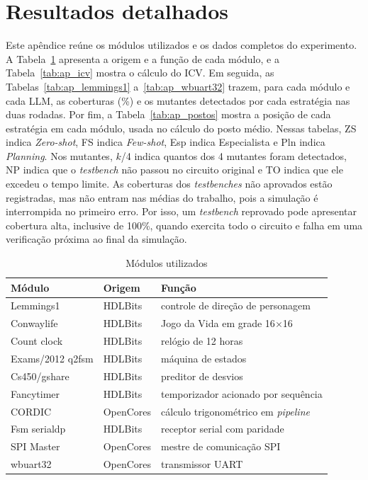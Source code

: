 
\section{Resultados detalhados}
\label{ap:resultados}

Este apêndice reúne os módulos utilizados e os dados completos do experimento. A Tabela~\ref{tab:modulos} apresenta a origem e a função de cada módulo, e a Tabela~\ref{tab:ap_icv} mostra o cálculo do ICV. Em seguida, as Tabelas~\ref{tab:ap_lemmings1} a~\ref{tab:ap_wbuart32} trazem, para cada módulo e cada LLM, as coberturas (\%) e os mutantes detectados por cada estratégia nas duas rodadas. Por fim, a Tabela~\ref{tab:ap_postos} mostra a posição de cada estratégia em cada módulo, usada no cálculo do posto médio. Nessas tabelas, ZS indica \textit{Zero-shot}, FS indica \textit{Few-shot}, Esp indica Especialista e Pln indica \textit{Planning}. Nos mutantes, $k$/4 indica quantos dos 4 mutantes foram detectados, NP indica que o \textit{testbench} não passou no circuito original e TO indica que ele excedeu o tempo limite. As coberturas dos \textit{testbenches} não aprovados estão registradas, mas não entram nas médias do trabalho, pois a simulação é interrompida no primeiro erro. Por isso, um \textit{testbench} reprovado pode apresentar cobertura alta, inclusive de 100\%, quando exercita todo o circuito e falha em uma verificação próxima ao final da simulação.

\begin{table}[htbp]
  \centering
  \caption{Módulos utilizados}
  \label{tab:modulos}
  \footnotesize
  \begin{tabular}{@{}lll@{}}
    \toprule
    Módulo & Origem & Função \\
    \midrule
    Lemmings1 & HDLBits & controle de direção de personagem \\
    Conwaylife & HDLBits & Jogo da Vida em grade 16$\times$16 \\
    Count clock & HDLBits & relógio de 12 horas \\
    Exams/2012 q2fsm & HDLBits & máquina de estados \\
    Cs450/gshare & HDLBits & preditor de desvios \\
    Fancytimer & HDLBits & temporizador acionado por sequência \\
    CORDIC & OpenCores & cálculo trigonométrico em \textit{pipeline} \\
    Fsm serialdp & HDLBits & receptor serial com paridade \\
    SPI Master & OpenCores & mestre de comunicação SPI \\
    wbuart32 & OpenCores & transmissor UART \\
    \bottomrule
  \end{tabular}
\end{table}

